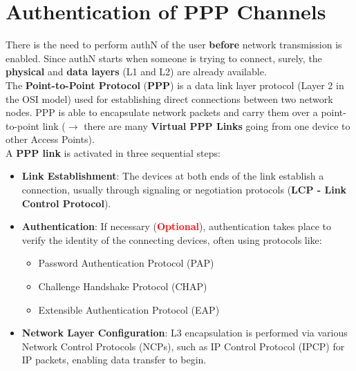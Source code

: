 \section{Authentication of PPP Channels}
There is the need to perform authN of the user \textbf{before} network transmission is enabled. Since
authN starts when someone is trying to connect, surely, the \textbf{physical} and \textbf{data layers} (L1 and L2) are already available.\\ The \textbf{Point-to-Point Protocol} (\textbf{PPP}) is a data link layer protocol (Layer 2 in the OSI model)
used for establishing direct connections between two network nodes. PPP is able to
encapsulate network packets and carry them over a point-to-point link (\(\rightarrow \)  there are many \textbf{Virtual PPP Links} going from one device to other Access Points).
\\ A \textbf{PPP link} is activated in three sequential steps:
\begin{itemize}
    \item \textbf{Link Establishment}: The devices at both ends of the link establish a connection, usually through signaling or negotiation protocols (\textbf{LCP - Link Control Protocol}).
    \item \textbf{Authentication}: If necessary (\textcolor{red}{\textbf{Optional}}), authentication takes place to verify the identity of the connecting devices, often using protocols like:
    \begin{itemize}
        \item Password Authentication Protocol (PAP)
        \item Challenge Handshake Protocol (CHAP)
        \item Extensible Authentication Protocol (EAP)
    \end{itemize} 
    \item \textbf{Network Layer Configuration}: L3 encapsulation is performed via various Network Control Protocols (NCPs), such as IP Control Protocol (IPCP) for IP packets, enabling data transfer to begin.
\end{itemize}
\newpage

